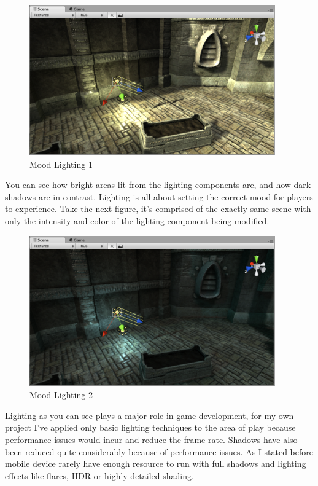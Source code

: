 \begin{figure}[!ht]
	\caption{Mood Lighting 1}
	\centering
	\includegraphics{img/light-mood-1.png}
\end{figure}

You can see how bright areas lit from the lighting components are, and how dark shadows are in contrast. Lighting is all about setting the correct mood for players to experience. Take the next figure, it's comprised of the exactly same scene with only the intensity and color of the lighting component being modified.

\begin{figure}[!ht]
	\caption{Mood Lighting 2}
	\centering
	\includegraphics{img/light-mood-2.png}
\end{figure}

Lighting as you can see plays a major role in game development, for my own project I've applied only basic lighting techniques to the area of play because performance issues would incur and reduce the frame rate. Shadows have also been reduced quite considerably because of performance issues. As I stated before mobile device rarely have enough resource to run with full shadows and lighting effects like flares, HDR or highly detailed shading.
